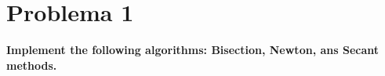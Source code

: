 \section*{Problema 1}
\textbf{Implement the following algorithms: Bisection, Newton, ans Secant methods.}